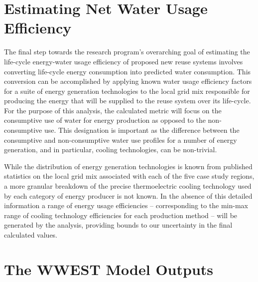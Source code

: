 \section{Estimating Net Water Usage Efficiency}

The final step towards the research program's overarching goal of estimating the life-cycle energy-water usage efficiency of proposed new reuse systems involves converting life-cycle energy consumption into predicted water consumption. This conversion can be accomplished by applying known water usage efficiency factors for a suite of energy generation technologies to the local grid mix responsible for producing the energy that will be supplied to the reuse system over its life-cycle. For the purpose of this analysis, the calculated metric will focus on the consumptive use of water for energy production as opposed to the non-consumptive use. This designation is important as the difference between the consumptive and non-consumptive water use profiles for a number of energy generation, and in particular, cooling technologies, can be non-trivial.

While the distribution of energy generation technologies is known from published statistics on the local grid mix associated with each of the five case study regions, a more granular breakdown of the precise thermoelectric cooling technology used by each category of energy producer is not known. In the absence of this detailed information a range of energy usage efficiencies -- corresponding to the min-max range of cooling technology efficiencies for each production method -- will be generated by the analysis, providing bounds to our uncertainty in the final calculated values. 

\section{The WWEST Model Outputs}

